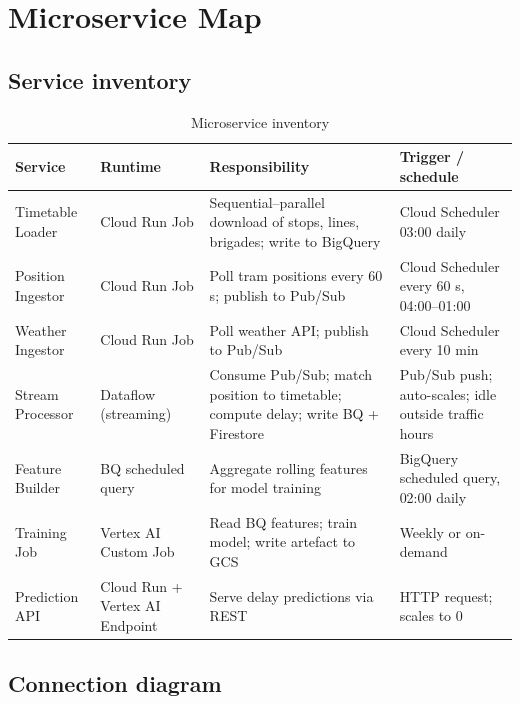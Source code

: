 \documentclass[11pt,a4paper]{article}
\newcommand{\hd}[1]{\textbf{\small #1}}
\newcommand{\ce}[1]{\small #1}
\begin{document}
\section{Microservice Map}

\subsection{Service inventory}

\begin{table}[H]
\centering
\caption{Microservice inventory}
\renewcommand{\arraystretch}{1.38}
\begin{tabularx}{\linewidth}{L{3.0cm} L{2.3cm} L{3.6cm} X}
\toprule
\hd{Service} & \hd{Runtime} & \hd{Responsibility} & \hd{Trigger / schedule} \\
\midrule
{}
\ce{Timetable Loader} & Cloud Run Job
  & Sequential--parallel download of stops, lines, brigades; write to BigQuery
  & Cloud Scheduler 03:00 daily \\
\ce{Position Ingestor} & Cloud Run Job
  & Poll tram positions every 60 s; publish to Pub/Sub
  & Cloud Scheduler every 60 s, 04:00--01:00 \\
\ce{Weather Ingestor} & Cloud Run Job
  & Poll weather API; publish to Pub/Sub
  & Cloud Scheduler every 10 min \\
\ce{Stream Processor} & Dataflow (streaming)
  & Consume Pub/Sub; match position to timetable; compute delay; write BQ + Firestore
  & Pub/Sub push; auto-scales; idle outside traffic hours \\
\ce{Feature Builder} & BQ scheduled query
  & Aggregate rolling features for model training
  & BigQuery scheduled query, 02:00 daily \\
\ce{Training Job} & Vertex AI Custom Job
  & Read BQ features; train model; write artefact to GCS
  & Weekly or on-demand \\
\ce{Prediction API} & Cloud Run + Vertex AI Endpoint
  & Serve delay predictions via REST
  & HTTP request; scales to 0 \\
\bottomrule
\end{tabularx}
\end{table}

\subsection{Connection diagram}
\end{document}
